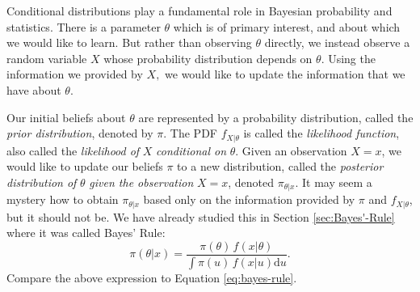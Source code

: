 \documentclass[captions=tableheading]{scrbook}
\begin{document}
Conditional distributions play a fundamental role in Bayesian probability and statistics. There is a parameter \(\theta\) which is of primary interest, and about which we would like to learn. But rather than observing \(\theta\) directly, we instead observe a random variable \(X\) whose probability distribution depends on \(\theta\). Using the information we provided by \(X,\) we would like to update the information that we have about \(\theta\).

Our initial beliefs about \(\theta\) are represented by a probability distribution, called the \emph{prior distribution}, denoted by \(\pi\). The PDF \(f_{X|\theta}\) is called the \emph{likelihood function}, also called the \emph{likelihood of} \(X\) \emph{conditional on} \(\theta\). Given an observation \(X=x\), we would like to update our beliefs \(\pi\) to a new distribution, called the \emph{posterior distribution of} \(\theta\) \emph{given the observation} \(X=x\), denoted \(\pi_{\theta|x}\). It may seem a mystery how to obtain \(\pi_{\theta|x}\) based only on the information provided by \(\pi\) and \(f_{X|\theta}\), but it should not be. We have already studied this in Section \ref{sec:Bayes'-Rule} where it was called Bayes' Rule:
\begin{equation} 
\pi(\theta|x)=\frac{\pi(\theta)\, f(x|\theta)}{\int\pi(u)\, f(x|u)\mathrm{d} u}.
\end{equation} 
Compare the above expression to Equation \ref{eq:bayes-rule}.
\end{document}
